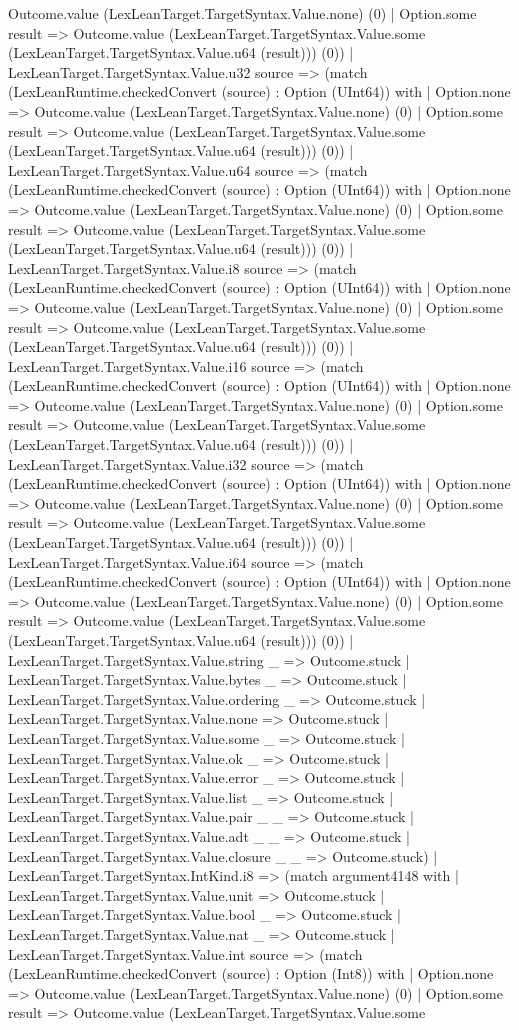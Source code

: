 \documentclass[11pt]{article}
\begin{document}
Outcome.value (LexLeanTarget.TargetSyntax.Value.none) (0) | Option.some result => Outcome.value (LexLeanTarget.TargetSyntax.Value.some (LexLeanTarget.TargetSyntax.Value.u64 (result))) (0)) | LexLeanTarget.TargetSyntax.Value.u32 source => (match (LexLeanRuntime.checkedConvert (source) : Option (UInt64)) with | Option.none => Outcome.value (LexLeanTarget.TargetSyntax.Value.none) (0) | Option.some result => Outcome.value (LexLeanTarget.TargetSyntax.Value.some (LexLeanTarget.TargetSyntax.Value.u64 (result))) (0)) | LexLeanTarget.TargetSyntax.Value.u64 source => (match (LexLeanRuntime.checkedConvert (source) : Option (UInt64)) with | Option.none => Outcome.value (LexLeanTarget.TargetSyntax.Value.none) (0) | Option.some result => Outcome.value (LexLeanTarget.TargetSyntax.Value.some (LexLeanTarget.TargetSyntax.Value.u64 (result))) (0)) | LexLeanTarget.TargetSyntax.Value.i8 source => (match (LexLeanRuntime.checkedConvert (source) : Option (UInt64)) with | Option.none => Outcome.value (LexLeanTarget.TargetSyntax.Value.none) (0) | Option.some result => Outcome.value (LexLeanTarget.TargetSyntax.Value.some (LexLeanTarget.TargetSyntax.Value.u64 (result))) (0)) | LexLeanTarget.TargetSyntax.Value.i16 source => (match (LexLeanRuntime.checkedConvert (source) : Option (UInt64)) with | Option.none => Outcome.value (LexLeanTarget.TargetSyntax.Value.none) (0) | Option.some result => Outcome.value (LexLeanTarget.TargetSyntax.Value.some (LexLeanTarget.TargetSyntax.Value.u64 (result))) (0)) | LexLeanTarget.TargetSyntax.Value.i32 source => (match (LexLeanRuntime.checkedConvert (source) : Option (UInt64)) with | Option.none => Outcome.value (LexLeanTarget.TargetSyntax.Value.none) (0) | Option.some result => Outcome.value (LexLeanTarget.TargetSyntax.Value.some (LexLeanTarget.TargetSyntax.Value.u64 (result))) (0)) | LexLeanTarget.TargetSyntax.Value.i64 source => (match (LexLeanRuntime.checkedConvert (source) : Option (UInt64)) with | Option.none => Outcome.value (LexLeanTarget.TargetSyntax.Value.none) (0) | Option.some result => Outcome.value (LexLeanTarget.TargetSyntax.Value.some (LexLeanTarget.TargetSyntax.Value.u64 (result))) (0)) | LexLeanTarget.TargetSyntax.Value.string \_ => Outcome.stuck | LexLeanTarget.TargetSyntax.Value.bytes \_ => Outcome.stuck | LexLeanTarget.TargetSyntax.Value.ordering \_ => Outcome.stuck | LexLeanTarget.TargetSyntax.Value.none => Outcome.stuck | LexLeanTarget.TargetSyntax.Value.some \_ => Outcome.stuck | LexLeanTarget.TargetSyntax.Value.ok \_ => Outcome.stuck | LexLeanTarget.TargetSyntax.Value.error \_ => Outcome.stuck | LexLeanTarget.TargetSyntax.Value.list \_ => Outcome.stuck | LexLeanTarget.TargetSyntax.Value.pair \_ \_ => Outcome.stuck | LexLeanTarget.TargetSyntax.Value.adt \_ \_ => Outcome.stuck | LexLeanTarget.TargetSyntax.Value.closure \_ \_ => Outcome.stuck) | LexLeanTarget.TargetSyntax.IntKind.i8 => (match argument4148 with | LexLeanTarget.TargetSyntax.Value.unit => Outcome.stuck | LexLeanTarget.TargetSyntax.Value.bool \_ => Outcome.stuck | LexLeanTarget.TargetSyntax.Value.nat \_ => Outcome.stuck | LexLeanTarget.TargetSyntax.Value.int source => (match (LexLeanRuntime.checkedConvert (source) : Option (Int8)) with | Option.none => Outcome.value (LexLeanTarget.TargetSyntax.Value.none) (0) | Option.some result => Outcome.value (LexLeanTarget.TargetSyntax.Value.some 
\end{document}
